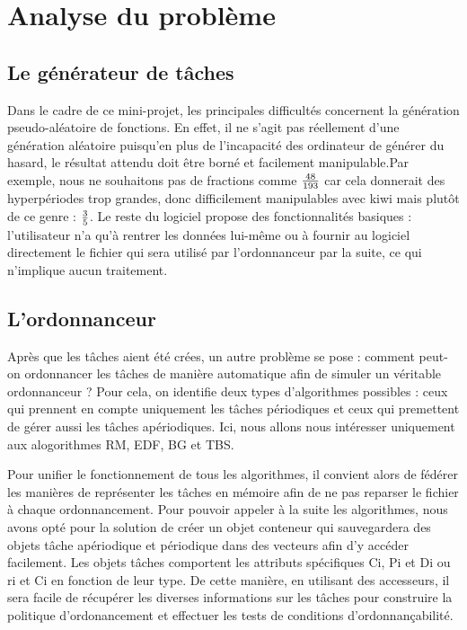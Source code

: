 	
	
	
\chapter{Analyse du problème}
	\section{Le générateur de tâches}
		Dans le cadre de ce mini-projet, les principales difficultés concernent la génération pseudo-aléatoire de fonctions. En effet, il ne s'agit pas réellement d'une génération aléatoire puisqu'en plus de l'incapacité des ordinateur de générer du hasard, le résultat attendu doit être borné et facilement manipulable.Par exemple, nous ne souhaitons pas de fractions comme ${48 \over 193}$ car cela donnerait des hyperpériodes trop grandes, donc difficilement manipulables avec kiwi mais plutôt de ce genre : ${3 \over 5}$.
		Le reste du logiciel propose des fonctionnalités basiques : l'utilisateur n'a qu'à rentrer les données lui-même ou à fournir au logiciel directement le fichier qui sera utilisé par l'ordonnanceur par la suite, ce qui n'implique aucun traitement.

	\section{L'ordonnanceur}
		Après que les tâches aient été crées, un autre problème se pose : comment peut-on ordonnancer les tâches de manière automatique afin de simuler un véritable ordonnanceur ? Pour cela, on identifie deux types d'algorithmes possibles : ceux qui prennent en compte uniquement les tâches périodiques et ceux qui premettent de gérer aussi les tâches apériodiques. Ici, nous allons nous intéresser uniquement aux alogorithmes RM, EDF, BG et TBS.
		
		Pour unifier le fonctionnement de tous les algorithmes, il convient alors de fédérer les manières de représenter les tâches en mémoire afin de ne pas reparser le fichier à chaque ordonnancement. Pour pouvoir appeler à la suite les algorithmes, nous avons opté pour la solution de créer un objet conteneur qui sauvegardera des objets tâche apériodique et périodique dans des vecteurs afin d'y accéder facilement.
		Les objets tâches comportent les attributs spécifiques Ci, Pi et Di ou ri et Ci en fonction de leur type. De cette manière, en utilisant des accesseurs, il sera facile de récupérer les diverses informations sur les tâches pour construire la politique d'ordonancement et effectuer les tests de conditions d'ordonnançabilité.

